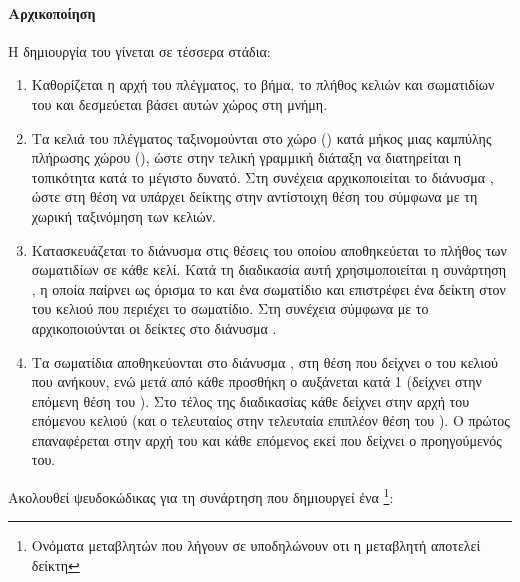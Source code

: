 \paragraph{Αρχικοποίηση} Η δημιουργία του  γίνεται σε τέσσερα στάδια:
\begin{enumerate}
\item Καθορίζεται η αρχή του πλέγματος, το βήμα, το πλήθος κελιών και σωματιδίων του και
  δεσμεύεται βάσει αυτών χώρος στη μνήμη.

\item Τα κελιά του πλέγματος ταξινομούνται στο χώρο () κατά μήκος μιας
  καμπύλης πλήρωσης χώρου (), ώστε στην τελική γραμμική διάταξη
  να διατηρείται η τοπικότητα κατά το μέγιστο δυνατό. Στη συνέχεια αρχικοποιείται το
  διάνυσμα , ώστε στη θέση  να υπάρχει δείκτης στην
  αντίστοιχη θέση του  σύμφωνα με τη χωρική ταξινόμηση των κελιών.

\item Κατασκευάζεται το διάνυσμα  στις θέσεις του οποίου αποθηκεύεται το
  πλήθος των σωματιδίων σε κάθε κελί. Κατά τη διαδικασία αυτή χρησιμοποιείται η συνάρτηση
  , η οποία παίρ\-νει ως όρισμα το  και ένα σωματίδιο
  και επιστρέφει ένα δείκτη στον  του κελιού που περιέχει το σωματίδιο. Στη
  συνέχεια σύμφωνα με το  αρχικοποιούνται οι δείκτες στο διάνυσμα
  .

\item Τα σωματίδια αποθηκεύονται στο διάνυσμα , στη θέση που δείχνει ο
   του κελιού που ανήκουν, ενώ μετά από κάθε προσθήκη ο  αυξάνεται
  κατά 1 (δείχνει στην επόμενη θέση του ). Στο τέλος της διαδικασίας κάθε
   δείχνει στην αρχή του επόμενου κελιού (και ο τελευταίος στην τελευταία
  επιπλέον θέση του ). Ο πρώτος  επαναφέρεται στην αρχή του
   και κάθε επόμενος εκεί που δείχνει ο προηγούμενός του.
\end{enumerate}
Ακολουθεί ψευδοκώδικας για τη συνάρτηση  που δημιουργεί ένα
\footnote{Ονόματα μεταβλητών που λήγουν σε  υποδηλώνουν οτι η
  μεταβλητή αποτελεί δείκτη}: 
